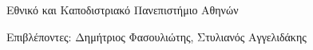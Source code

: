 \begin{frame}[plain]
		\begin{center}
			Εθνικό και Καποδιστριακό Πανεπιστήμιο Αθηνών
		\end{center}
		\vfill
		\titlepage
		\begin{center}
			\small{Επιβλέποντες: Δημήτριος Φασουλιώτης, Στυλιανός Αγγελιδάκης}
		\end{center}
	\end{frame}